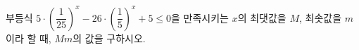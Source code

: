 부등식 $5\cdot\left(\dfrac{1}{25}\right)^x-26\cdot\left(\dfrac{1}{5}\right)^x+5\le 0$을 만족시키는 $x$의 최댓값을 $M$, 최솟값을 $m$이라 할 때, $Mm$의 값을 구하시오.
